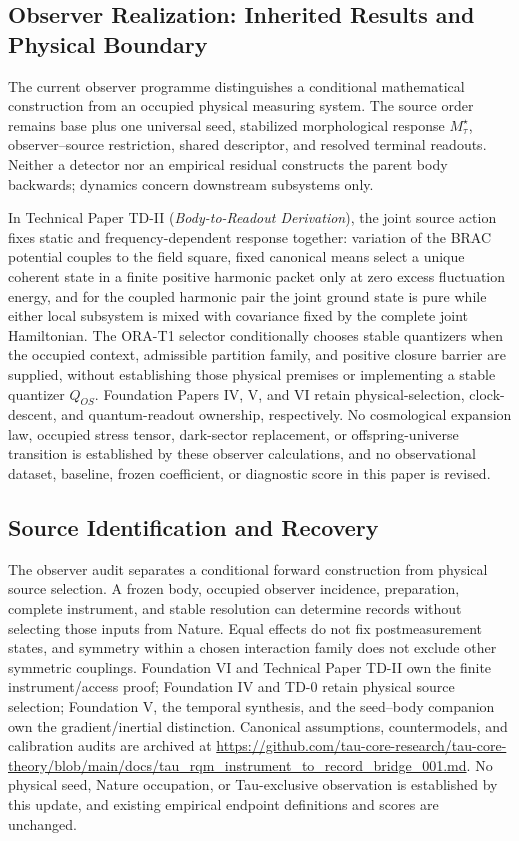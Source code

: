 \documentclass[11pt]{article}
\begin{document}
\subsection{Observer Realization: Inherited Results and Physical Boundary}
\label{sec:observer-update-20260914}
The current observer programme distinguishes a conditional mathematical
construction from an occupied physical measuring system. The source order
remains base plus one universal seed, stabilized morphological response
$M_\tau^\star$, observer--source restriction, shared descriptor, and resolved
terminal readouts. Neither a detector nor an empirical residual constructs the
parent body backwards; dynamics concern downstream subsystems only.

In Technical Paper TD-II (\emph{Body-to-Readout Derivation}), the joint source
action fixes static and frequency-dependent response together: variation of the
BRAC potential couples to the field square, fixed canonical means select a
unique coherent state in a finite positive harmonic packet only at zero excess
fluctuation energy, and for the coupled harmonic pair the joint ground state is
pure while either local subsystem is mixed with covariance fixed by the
complete joint Hamiltonian. The ORA-T1 selector conditionally chooses stable
quantizers when the occupied context, admissible partition family, and positive
closure barrier are supplied, without establishing those physical premises or
implementing a stable quantizer $Q_{OS}$. Foundation Papers IV, V, and VI
retain physical-selection, clock-descent, and quantum-readout ownership,
respectively. No cosmological expansion law, occupied stress tensor,
dark-sector replacement, or offspring-universe transition is established by
these observer calculations, and no observational dataset, baseline, frozen
coefficient, or diagnostic score in this paper is revised.

\subsection{Source Identification and Recovery}
The observer audit separates a conditional forward construction from physical source selection. A frozen body, occupied observer incidence, preparation, complete instrument, and stable resolution can determine records without selecting those inputs from Nature. Equal effects do not fix postmeasurement states, and symmetry within a chosen interaction family does not exclude other symmetric couplings. Foundation VI and Technical Paper TD-II own the finite instrument/access proof; Foundation IV and TD-0 retain physical source selection; Foundation V, the temporal synthesis, and the seed--body companion own the gradient/inertial distinction. Canonical assumptions, countermodels, and calibration audits are archived at \url{https://github.com/tau-core-research/tau-core-theory/blob/main/docs/tau_rqm_instrument_to_record_bridge_001.md}. No physical seed, Nature occupation, or Tau-exclusive observation is established by this update, and existing empirical endpoint definitions and scores are unchanged.
\end{document}
